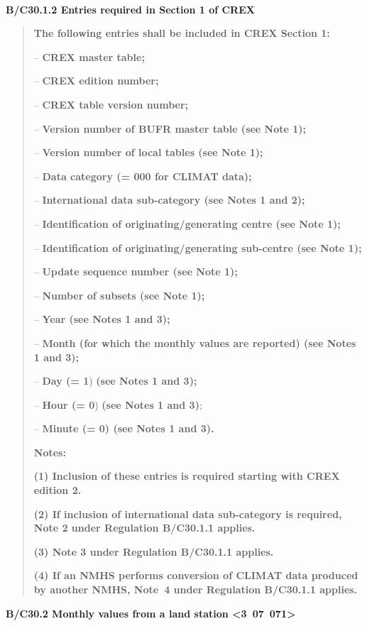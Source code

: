 \textbf{\\
}

\textbf{B/C30.1.2 Entries required in Section 1 of CREX}

\begin{quote}
\textbf{The following entries shall be included in CREX Section 1:}

-- \textbf{CREX master table;}

-- \textbf{CREX edition number;}

-- \textbf{CREX table version number;}

-- \textbf{Version number of BUFR master table (see Note 1);}

-- \textbf{Version number of local tables (see Note 1);}

-- \textbf{Data category (= 000 for CLIMAT data);}

-- \textbf{International data sub-category (see Notes 1 and 2);}

-- \textbf{Identification of originating/generating centre (see Note 1);}

-- \textbf{Identification of originating/generating sub-centre (see Note 1);}

-- \textbf{Update sequence number (see Note 1);}

-- \textbf{Number of subsets (see Note 1);}

-- \textbf{Year (see Notes 1 and 3);}

-- \textbf{Month (for which the monthly values are reported) (see Notes 1 and 3);}

-- \textbf{Day (= 1}) \textbf{(see Notes 1 and 3);}

-- \textbf{Hour (= 0}) \textbf{(see Notes 1 and 3)};

-- \textbf{Minute (= 0) (see Notes 1 and 3).}

\textbf{Notes:}

\textbf{(1) Inclusion of these entries is required starting with CREX edition 2.}

\textbf{(2) If inclusion of international data sub-category is required, Note 2 under Regulation B/C30.1.1 applies.}

\textbf{(3) Note 3 under Regulation B/C30.1.1 applies.}

\textbf{(4) If an NMHS performs conversion of CLIMAT data produced by another NMHS, Note~4 under Regulation B/C30.1.1 applies.}
\end{quote}

\textbf{B/C30.2 Monthly values from a land station \textless3~07~071\textgreater{}}


